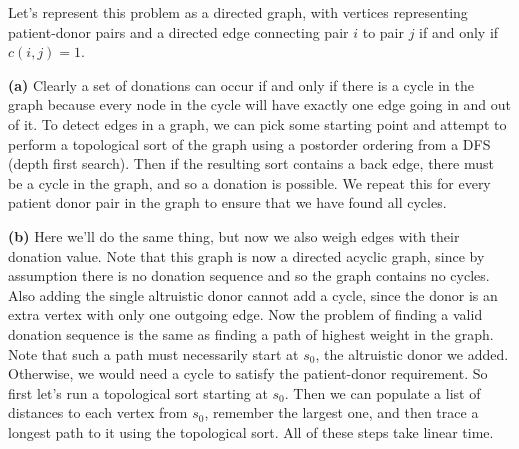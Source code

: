 \documentclass[11pt,letterpaper]{article}
\begin{document}
\begin{solution}
    Let's represent this problem as a directed graph, with vertices representing patient-donor pairs and a directed edge connecting pair $i$ to pair $j$ if and only if $c(i,j)=1$. 

    \textbf{(a)} Clearly a set of donations can occur if and only if there is a cycle in the graph because every node in the cycle will have exactly one edge going in and out of it. To detect edges in a graph, we can pick some starting point and attempt to perform a topological sort of the graph using a postorder ordering from a DFS (depth first search). Then if the resulting sort contains a back edge, there must be a cycle in the graph, and so a donation is possible. We repeat this for every patient donor pair in the graph to ensure that we have found all cycles.
    
    \textbf{(b)} Here we'll do the same thing, but now we also weigh edges with their donation value. Note that this graph is now a directed acyclic graph, since by assumption there is no donation sequence and so the graph contains no cycles. Also adding the single altruistic donor cannot add a cycle, since the donor is an extra vertex with only one outgoing edge. Now the problem of finding a valid donation sequence is the same as finding a path of highest weight in the graph. Note that such a path must necessarily start at $s_0$, the altruistic donor we added. Otherwise, we would need a cycle to satisfy the patient-donor requirement. So first let's run a topological sort starting at $s_0$. Then we can populate a list of distances to each vertex from $s_0$, remember the largest one, and then trace a longest path to it using the topological sort. All of these steps take linear time.
\end{solution}
\end{document}
